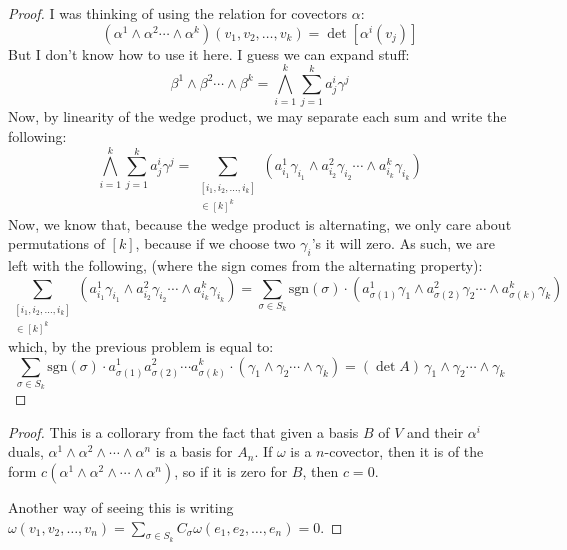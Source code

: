 \begin{problem}
\end{problem}
\begin{proof}
	I was thinking of using the relation for covectors $\alpha$:
	$$(\alpha^1 \wedge \alpha^2 \cdots \wedge \alpha^k)(v_1, v_2, \dots, v_k) = \det[\alpha^i(v_j)]$$
	But I don't know how to use it here. I guess we can expand stuff:
	$$\beta^1 \wedge \beta^2 \cdots \wedge \beta^k = \bigwedge_{i = 1}^{k} \sum_{j = 1}^{k} a^i_j \gamma^j$$
	Now, by linearity of the wedge product, we may separate each sum and write the following:
	$$\bigwedge_{i = 1}^{k} \sum_{j = 1}^{k} a^i_j \gamma^j =
		\sum_{\substack{[i_1, i_2, \dots, i_k]\\ \in [k]^k}} (a^1_{i_1} \gamma_{i_1} \wedge a^2_{i_2}\gamma_{i_2} \cdots \wedge a^k_{i_k}\gamma_{i_k})$$
	Now, we know that, because the wedge product is alternating, we only care about permutations of $[k]$, because if we choose two $\gamma_i$'s it will zero.
	As such, we are left with the following, (where the sign comes from the alternating property):
	$$\sum_{\substack{[i_1, i_2, \dots, i_k]\\ \in [k]^k}} (a^1_{i_1} \gamma_{i_1} \wedge a^2_{i_2}\gamma_{i_2} \cdots \wedge a^k_{i_k}\gamma_{i_k}) =
		\sum_{\sigma \in S_k} \text{sgn}(\sigma) \cdot (a^1_{\sigma(1)} \gamma_{1} \wedge a^2_{\sigma(2)}\gamma_{2} \cdots \wedge a^k_{\sigma(k)}\gamma_{k}) $$
	which, by the previous problem is equal to:
	$$\sum_{\sigma \in S_k} \text{sgn}(\sigma) \cdot a^1_{\sigma(1)}a^2_{\sigma(2)}\cdots a^k_{\sigma(k)} \cdot (\gamma_{1} \wedge \gamma_{2} \cdots \wedge \gamma_{k}) =
		(\det A)\, \gamma_{1} \wedge \gamma_{2} \cdots \wedge \gamma_{k}$$
\end{proof}

\begin{problem}
\end{problem}
\begin{proof}
	This is a collorary from the fact that given a basis $B$ of $V$ and their $\alpha^i$ duals, $\alpha^1 \wedge \alpha^2 \wedge \cdots \wedge \alpha^n$ is a basis for $A_n$. If $\omega$ is a $n$-covector,
	then it is of the form $c(\alpha^1 \wedge \alpha^2 \wedge \cdots \wedge \alpha^n)$, so if it is zero for $B$, then $c = 0$.

	Another way of seeing this is writing $\omega(v_1, v_2, \dots, v_n) = \sum_{\sigma \in S_k} C_\sigma \omega(e_1, e_2, \dots, e_n) = 0$.
\end{proof}

